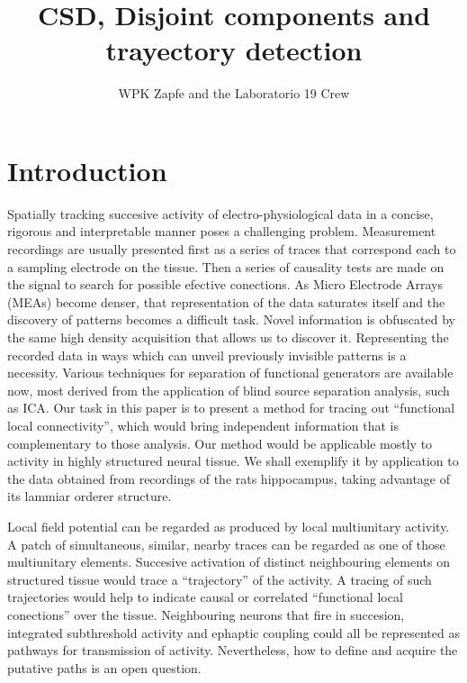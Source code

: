 \documentclass[12pt]{article}
\author{WPK Zapfe and the Laboratorio 19 Crew}
\title{CSD, Disjoint components and trayectory detection}
\begin{document}
\maketitle

\section{Introduction}

Spatially tracking succesive activity of electro-physiological data in a concise,
rigorous and interpretable manner poses a challenging problem. Measurement recordings
are usually presented first as a series of traces that correspond each to a sampling
electrode on the tissue. Then a series of causality tests are made on the
signal to search for possible efective conections. 
As Micro Electrode Arrays (MEAs) become denser, that representation
of the data saturates itself  and the discovery of patterns becomes a difficult task.
Novel information is obfuscated by the same high density acquisition that allows us to
discover it. Representing  the recorded data in ways which can unveil previously
invisible patterns is a necessity. Various techniques for separation of functional
generators are available now, most derived from the application of blind source
separation analysis, such as ICA. 
Our task in this paper is to present a method for tracing out
``functional local connectivity'', which would bring independent information
that is complementary to those analysis.  Our  method would be applicable mostly to
activity in highly structured neural tissue. We shall exemplify it by application to
the data obtained from recordings of the rats hippocampus,
taking advantage of its lammiar orderer structure. 

Local field potential can be regarded as produced by local multiunitary activity.
A patch of simultaneous, similar, nearby traces can be regarded as one of those
multiunitary elements. 
Succesive activation  of distinct neighbouring elements on structured
tissue would trace a
``trajectory'' of the activity. A tracing of such trajectories would help to indicate
causal or correlated ``functional local conections'' over the tissue. Neighbouring
neurons that fire in succesion, integrated subthreshold activity and ephaptic coupling
could all be represented as pathways for transmission of activity. Nevertheless,
how to define and acquire the putative paths is an open question.
\end{document}
